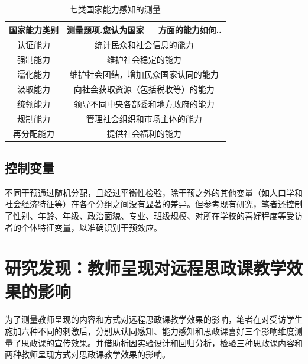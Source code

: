 \documentclass[
  12pt,
]{ctexart}
\begin{document}
\begin{table}[!h]

\caption{\label{tab:unnamed-chunk-5}七类国家能力感知的测量}
\centering
\begin{tabular}[t]{cc}
\toprule
国家能力类别 & 测量题项.您认为国家\_\_方面的能力如何..\\
\midrule
认证能力 & 统计民众和社会信息的能力\\
强制能力 & 维护社会稳定的能力\\
濡化能力 & 维护社会团结，增加民众国家认同的能力\\
汲取能力 & 向社会获取资源（包括税收等）的能力\\
统领能力 & 领导不同中央各部委和地方政府的能力\\
\addlinespace
规制能力 & 管理社会组织和市场主体的能力\\
再分配能力 & 提供社会福利的能力\\
\bottomrule
\end{tabular}
\end{table}

\hypertarget{ux63a7ux5236ux53d8ux91cf}{%
\subsection{控制变量}\label{ux63a7ux5236ux53d8ux91cf}}

不同干预通过随机分配，且经过平衡性检验，除干预之外的其他变量（如人口学和社会经济特征等）在各个分组之间没有显著的差异。但参考现有研究，笔者还控制了性别、年龄、年级、政治面貌、专业、班级规模、对所在学校的喜好程度等受访者的个体特征变量，以准确识别干预效应。

\hypertarget{ux7814ux7a76ux53d1ux73b0ux6559ux5e08ux5448ux73b0ux5bf9ux8fdcux7a0bux601dux653fux8bfeux6559ux5b66ux6548ux679cux7684ux5f71ux54cd}{%
\section{研究发现：教师呈现对远程思政课教学效果的影响}\label{ux7814ux7a76ux53d1ux73b0ux6559ux5e08ux5448ux73b0ux5bf9ux8fdcux7a0bux601dux653fux8bfeux6559ux5b66ux6548ux679cux7684ux5f71ux54cd}}

为了测量教师呈现的内容和方式对远程思政课教学效果的影响，笔者在对受访学生施加六种不同的刺激后，分别从认同感知、能力感知和思政课喜好三个影响维度测量了思政课的宣传效果。并借助析因实验设计和回归分析，检验三种思政课内容和两种教师呈现方式对思政课教学效果的影响。
\end{document}
